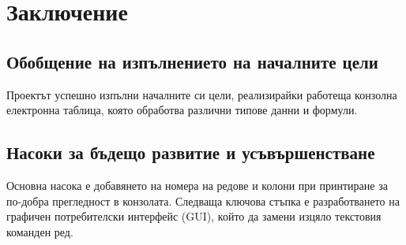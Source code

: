 \chapter{Заключение}

\section{Обобщение на изпълнението на началните цели}
Проектът успешно изпълни началните си цели, реализирайки работеща конзолна електронна таблица, която обработва различни типове данни и формули.

\section{Насоки за бъдещо развитие и усъвършенстване}
Основна насока е добавянето на номера на редове и колони при принтиране за по-добра прегледност в конзолата. Следваща ключова стъпка е разработването на графичен потребителски интерфейс (GUI), който да замени изцяло текстовия команден ред.